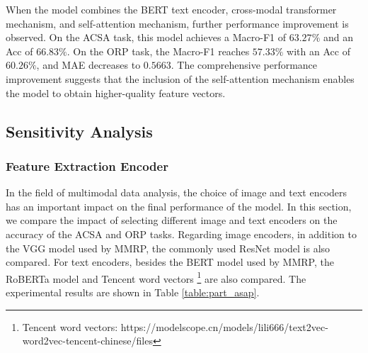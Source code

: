 \documentclass[preprint,12pt]{elsarticle}
\begin{document}
When the model combines the BERT text encoder, cross-modal transformer mechanism, and self-attention mechanism, further performance improvement is observed. On the ACSA task, this model achieves a Macro-F1 of $63.27\%$ and an Acc of $66.83\%$. On the ORP task, the Macro-F1 reaches $57.33\%$ with an Acc of $60.26\%$, and MAE decreases to $0.5663$. The comprehensive performance improvement suggests that the inclusion of the self-attention mechanism enables the model to obtain higher-quality feature vectors.

\subsection{Sensitivity Analysis}

\subsubsection{Feature Extraction Encoder}


In the field of multimodal data analysis, the choice of image and text encoders has an important impact on the final performance of the model. In this section, we compare the impact of selecting different image and text encoders on the accuracy of the ACSA and ORP tasks. Regarding image encoders, in addition to the VGG model used by MMRP, the commonly used ResNet model \citep{he2016deep} is also compared. For text encoders, besides the BERT model used by MMRP, the RoBERTa model \citep{liu2019roberta} and Tencent word vectors \footnote{Tencent word vectors: https://modelscope.cn/models/lili666/text2vec-word2vec-tencent-chinese/files} are also compared. The experimental results are shown in Table \ref{table:part_asap}.
\end{document}
